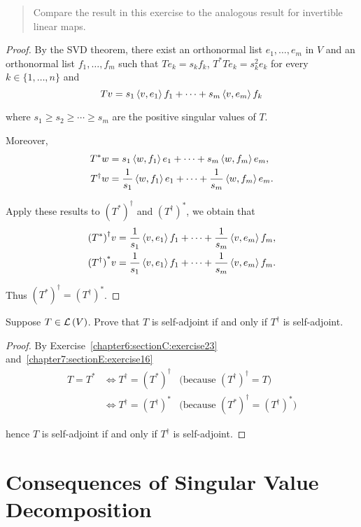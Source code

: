 \begin{quote}
    Compare the result in this exercise to the analogous result for invertible
    linear maps.
\end{quote}

\begin{proof}
    By the SVD theorem, there exist an orthonormal list $e_{1}, \ldots, e_{m}$ in $V$ and an orthonormal list $f_{1}, \ldots, f_{m}$ such that $Te_{k} = s_{k}f_{k}$, $T^{*}Te_{k} = s_{k}^{2}e_{k}$ for every $k\in\{1,\ldots,n\}$ and
    \[
        Tv = s_{1}\left\langle{v,e_{1}}\right\rangle f_{1} + \cdots + s_{m}\left\langle{v,e_{m}}\right\rangle f_{k}
    \]

    where $s_{1}\geq s_{2}\geq \cdots \geq s_{m}$ are the positive singular values of $T$.

    Moreover,
    \begin{align*}
        T^{*}w       & = s_{1}\left\langle{w,f_{1}}\right\rangle e_{1} + \cdots + s_{m}\left\langle{w, f_{m}}\right\rangle e_{m},                    \\
        T^{\dagger}w & = \frac{1}{s_{1}}\left\langle{w,f_{1}}\right\rangle e_{1} + \cdots + \frac{1}{s_{m}}\left\langle{w,f_{m}}\right\rangle e_{m}.
    \end{align*}

    Apply these results to ${(T^{*})}^{\dagger}$ and ${(T^{\dagger})}^{*}$, we obtain that
    \begin{align*}
        {(T^{*})}^{\dagger}v & = \frac{1}{s_{1}}\left\langle{v,e_{1}}\right\rangle f_{1} + \cdots + \frac{1}{s_{m}}\left\langle{v,e_{m}}\right\rangle f_{m}, \\
        {(T^{\dagger})}^{*}v & = \frac{1}{s_{1}}\left\langle{v,e_{1}}\right\rangle f_{1} + \cdots + \frac{1}{s_{m}}\left\langle{v,e_{m}}\right\rangle f_{m}.
    \end{align*}

    Thus ${(T^{*})}^{\dagger} = {(T^{\dagger})}^{*}$.
\end{proof}
\newpage

\begin{exercise}
    Suppose $T \in \mathcal{L}\left({V}\right)$. Prove that $T$ is self-adjoint if and only if $T^{\dagger}$ is self-adjoint.
\end{exercise}

\begin{proof}
    By Exercise~\ref{chapter6:sectionC:exercise23} and~\ref{chapter7:sectionE:exercise16}
    \begin{align*}
        T = T^{*} & \Longleftrightarrow T^{\dagger} = {(T^{*})}^{\dagger} & \text{(because ${(T^{\dagger})}^{\dagger} = T$)}             \\
                  & \Longleftrightarrow T^{\dagger} = {(T^{\dagger})}^{*} & \text{(because ${(T^{*})}^{\dagger} = {(T^{\dagger})}^{*}$)}
    \end{align*}

    hence $T$ is self-adjoint if and only if $T^{\dagger}$ is self-adjoint.
\end{proof}
\newpage

\section{Consequences of Singular Value Decomposition}

